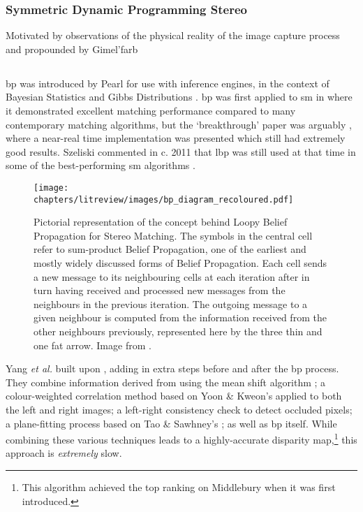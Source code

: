 \subsubsection{Symmetric Dynamic Programming Stereo}
Motivated by observations of the physical reality of the image capture process and propounded by Gimel'farb 

\subsection{}
\gls{bp} was introduced by Pearl \cite{Pearl1982} for use with inference engines, in the context of Bayesian Statistics \fxerror[inline]{[ref]} and Gibbs Distributions \fxerror[inline]{[ref]}.  \gls{bp} was first applied to \gls{sm} in \cite{Sun2003} where it demonstrated excellent matching performance compared to many contemporary matching algorithms, but the `breakthrough' paper was arguably \cite{Felzenszwalb2006}, where a near-real time implementation was presented which still had extremely good results.  Szeliski commented in c. 2011 that \gls{lbp} was still used at that time in some of the best-performing \gls{sm} algorithms \cite[p. 163]{Szeliski2011}.

\begin{figure}
    \centering
    \texttt{[image: chapters/litreview/images/bp\_diagram\_recoloured.pdf]}
    \caption[Pictorial representation of the concept behind  for \gls{sm}]{Pictorial representation of the concept behind Loopy Belief Propagation for Stereo Matching. The symbols in the central cell refer to sum-product Belief Propagation, one of the earliest and mostly widely discussed forms of Belief Propagation. Each cell sends a new message to its neighbouring cells at each iteration after in turn having received and processed new messages from the neighbours in the previous iteration. The outgoing message to a given neighbour is computed from the information received from the other neighbours previously, represented here by the three thin and one fat arrow.  Image from \cite{lbpmpsmpic}.}
    \label{fig:bpdiagram}
\end{figure}

Yang \textit{et al.} \cite{Yang2006a} built upon , adding in extra steps before and after the \gls{bp} process.  They combine information derived from using the mean shift algorithm \cite{Comaniciu2002}; a colour-weighted correlation method based on Yoon \& Kweon's \cite{Yoon2006} applied to both the left and right images; a left-right consistency check to detect occluded pixels; a plane-fitting process based on Tao \& Sawhney's \cite{Tao2000}; as well as \gls{bp} itself.  While combining these various techniques leads to a highly-accurate disparity map,\footnote{This algorithm achieved the top ranking on Middlebury when it was first introduced.} this approach is \emph{extremely} slow.

